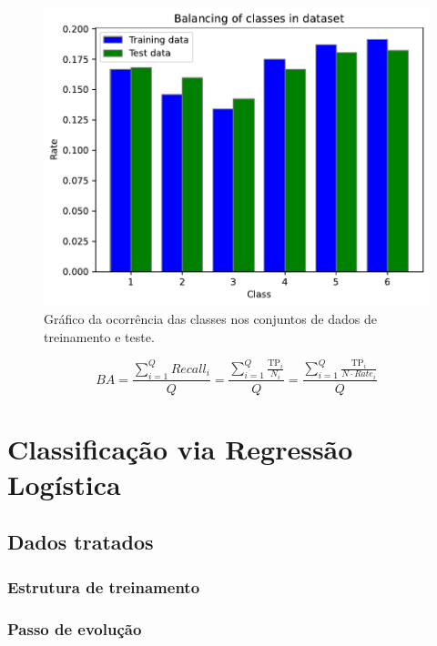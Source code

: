 \begin{figure}[H]
	\centering
	\includegraphics[width=0.75\linewidth]{../../plot/Balancing_of_classes}
	\caption{Gráfico da ocorrência das classes nos conjuntos de dados de treinamento e teste.}
	\label{fig:balancingofclasses}
\end{figure}

\begin{equation}\label{eq:ba}
	BA = \frac{\sum_{i=1}^{Q}Recall_i}{Q} = \frac{\sum_{i=1}^{Q}\frac{\text{TP}_i}{N_i}}{Q} = \frac{\sum_{i=1}^{Q}\frac{\text{TP}_i}{N\cdot Rate_i}}{Q}
\end{equation}




\section{Classificação via Regressão Logística}




\subsection{Dados tratados}

\subsubsection{Estrutura de treinamento}





\subsubsection{Passo de evolução}









